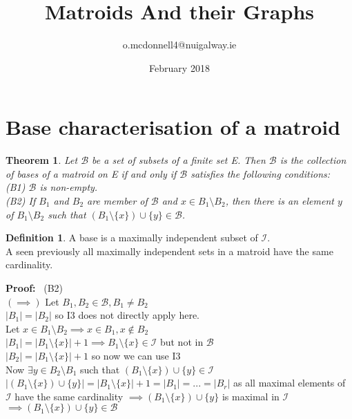 \documentclass{article}
\title{Matroids And their Graphs}
\author{o.mcdonnell4@nuigalway.ie }
\date{February 2018}
\theoremstyle{plain}
\newtheorem{thm}{Theorem}[section]
\theoremstyle{definition}
\newtheorem{defn}{Definition}[section]
\theoremstyle{remark}
\newcommand\Proof{%
    \textbf{Proof:}~%
}
\begin{document}
\maketitle
 
 \section{Base characterisation of a matroid}
 
 \begin{thm}
 Let $\mathcal{B}$ be a set of subsets of a finite set E. Then $\mathcal{B}$ is the collection of bases of a matroid on E if and only if $\mathcal{B}$ satisfies the following conditions:\\
 (B1) $\mathcal{B}$ is non-empty.\\
 (B2) If $B_1$ and $B_2$ are member of $\mathcal{B}$ and $x \in B_1 \setminus B_2$, then there is an element $y$ of $B_1 \setminus B_2$ such that $(B_1 \setminus \{x\}) \cup \{y\} \in \mathcal{B}$.
 \end{thm}
 
\begin{defn}
A base is a maximally independent subset of $\mathcal{I}$.\\
\noindent A seen previously all maximally independent sets in a matroid have the same cardinality.
\end{defn}

\noindent \Proof (B2) \\
\noindent $(\implies)$ Let $B_1 ,B_2 \in \mathcal{B}, B_1 \neq B_2$ \\
\noindent $|B_1| = |B_2|$ so I3 does not directly apply here.\\
\noindent Let $x \in B_1 \setminus B_2 \implies x \in B_1, x \notin B_2$\\
\noindent $|B_1| = |B_1 \setminus \{x\}| + 1 \implies B_1 \setminus \{x\} \in \mathcal{I}$ but not in $\mathcal{B}$\\
\noindent $|B_2| = |B_1 \setminus \{x\}| + 1$ so now we can use I3\\
\noindent Now $\exists y \in B_2 \setminus B_1$ such that $(B_1 \setminus \{x\}) \cup \{y\} \in \mathcal{I}$\\
$|(B_1 \setminus \{x\}) \cup \{y\}| = |B_1 \setminus \{x\}| + 1 = |B_1| = ... = |B_r|$ as all maximal elements of $\mathcal{I}$ have the same cardinality $\implies (B_1 \setminus \{x\}) \cup \{y\}$ is maximal in $\mathcal{I}$\\
$\implies (B_1 \setminus \{x\}) \cup \{y\} \in \mathcal{B}$
\end{document}
